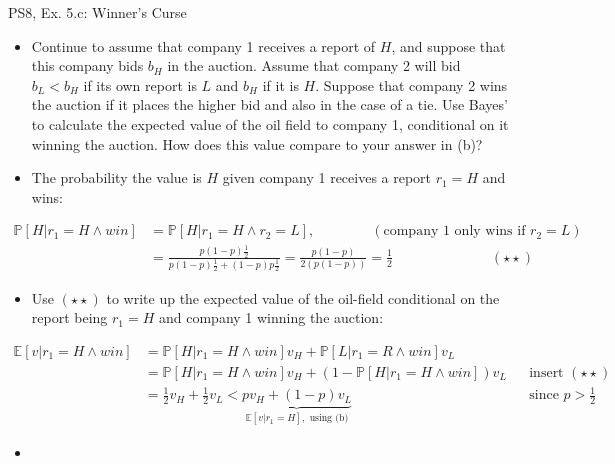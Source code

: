 \begin{frame}{PS8, Ex. 5.c: Winner's Curse}
      \begin{itemize}
        \item[(c)] Continue to assume that company 1 receives a report of $H$, and suppose that this company bids $b_H$ in the auction. Assume that company 2 will bid $b_L < b_H$ if its own report is $L$ and $b_H$ if it is $H$. Suppose that company 2 wins the auction if it places the higher bid and also in the case of a tie. Use Bayes’ to calculate the expected value of the oil field to company 1, conditional on it winning the auction. How does this value compare to your answer in (b)?
        \item[Step 1:] The probability the value is $H$ given company 1 receives a report $r_1=H$ and wins:
        \end{itemize}
        \vspace{-10pt}
        \begin{align*}
          \mathbb{P}[H|r_1=H\wedge win]&=\mathbb{P}[H|r_1=H\wedge r_2=L],\quad\quad\quad\quad(\text{company 1 only wins if }r_2=L)\\
            &=\frac{p(1-p)\frac{1}{2}}{p(1-p)\frac{1}{2}+(1-p)p\frac{1}{2}}=\frac{p(1-p)}{2(p(1-p))}=\frac{1}{2}\quad\quad\quad\quad\quad\quad\quad(\star\star)
        \end{align*}
        \vspace{-12pt}
        \begin{itemize}
        \item[Step 2:] Use $(\star\star)$ to write up the expected value of the oil-field conditional on the report being $r_1=H$ and company 1 winning the auction:
      \end{itemize}
      \vspace{-8pt}
      \begin{align*}
        \mathbb{E}[v|r_1=H\wedge win]&=\mathbb{P}[H|r_1=H\wedge win]v_H+\mathbb{P}[L|r_1=R\wedge win]v_L\\
        &=\mathbb{P}[H|r_1=H\wedge win]v_H+\left(1-\mathbb{P}[H|r_1=H\wedge win]\right)v_L&&\text{insert }(\star\star)\\
        &=\frac{1}{2}v_H+\frac{1}{2}v_L<\underbrace{pv_H+(1-p)v_L}_{\textstyle\mathbb{E}[v|r_1=H],\text{ using (b)}}&&\text{since }p>\frac{1}{2}
      \end{align*}
      \vspace{-10pt}
      \begin{itemize}
        \item[Step 3:] 
      \end{itemize}
      \vfill\null
\end{frame}
